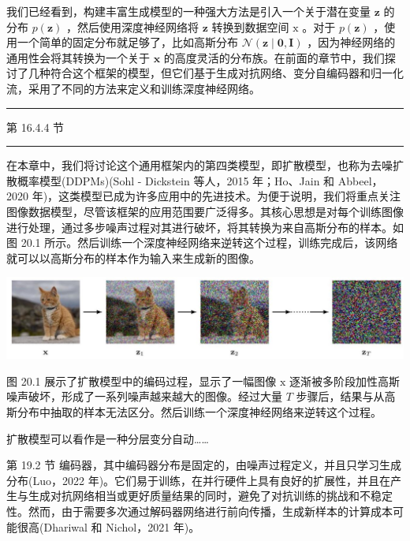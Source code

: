 \documentclass[10pt]{article}
\newcommand{\HRule}{\begin{center}\rule{0.9\linewidth}{0.2mm}\end{center}}
\begin{document}
我们已经看到，构建丰富生成模型的一种强大方法是引入一个关于潜在变量 \(\mathbf{z}\) 的分布 \(p\left( \mathbf{z}\right)\) ，然后使用深度神经网络将 \(\mathbf{z}\) 转换到数据空间 \(\mathrm{x}\) 。对于 \(p\left( \mathbf{z}\right)\) ，使用一个简单的固定分布就足够了，比如高斯分布 \(\mathcal{N}\left( {\mathbf{z} \mid  \mathbf{0},\mathbf{I}}\right)\) ，因为神经网络的通用性会将其转换为一个关于 \(\mathbf{x}\) 的高度灵活的分布族。在前面的章节中，我们探讨了几种符合这个框架的模型，但它们基于生成对抗网络、变分自编码器和归一化流，采用了不同的方法来定义和训练深度神经网络。

\HRule

第 16.4.4 节

\HRule

在本章中，我们将讨论这个通用框架内的第四类模型，即扩散模型，也称为去噪扩散概率模型(DDPMs)(Sohl - Dickstein 等人，2015 年；Ho、Jain 和 Abbeel，2020 年)，这类模型已成为许多应用中的先进技术。为便于说明，我们将重点关注图像数据模型，尽管该框架的应用范围要广泛得多。其核心思想是对每个训练图像进行处理，通过多步噪声过程对其进行破坏，将其转换为来自高斯分布的样本。如图 20.1 所示。然后训练一个深度神经网络来逆转这个过程，训练完成后，该网络就可以以高斯分布的样本作为输入来生成新的图像。

\begin{center}
\includegraphics[max width=1.0\textwidth]{images/0194e279-9b28-703a-88f4-c3ac21e2010d_601_227_356_1339_276_0.jpg}
\end{center}
\hspace*{3em} 

图 20.1 展示了扩散模型中的编码过程，显示了一幅图像 \(\mathrm{x}\) 逐渐被多阶段加性高斯噪声破坏，形成了一系列噪声越来越大的图像。经过大量 \(T\) 步骤后，结果与从高斯分布中抽取的样本无法区分。然后训练一个深度神经网络来逆转这个过程。

扩散模型可以看作是一种分层变分自动……

第 19.2 节 编码器，其中编码器分布是固定的，由噪声过程定义，并且只学习生成分布(Luo，2022 年)。它们易于训练，在并行硬件上具有良好的扩展性，并且在产生与生成对抗网络相当或更好质量结果的同时，避免了对抗训练的挑战和不稳定性。然而，由于需要多次通过解码器网络进行前向传播，生成新样本的计算成本可能很高(Dhariwal 和 Nichol，2021 年)。
\end{document}
